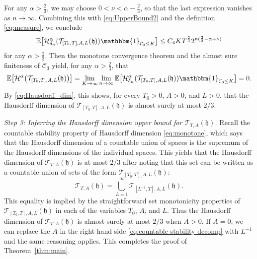 \documentclass[oneside,final,11pt]{amsart}
\theoremstyle{definition}
\newcommand{\fh}{\mathfrak{h}}
\newcommand{\CT}{\mathcal{T}}
\newcommand{\CC}{\mathcal{C}}
\newcommand{\CH}{\mathcal{H}}
\newcommand{\1}[1]{\mathbf{1}_{#1}}
\newcommand{\km}[1]{\marginnote{\tiny{\color{red}[KM: #1]}}}
\newcommand{\E}{\mathbb E}
\newcommand{\one}{\mathbbm{1}}
\numberwithin{equation}{section}
\begin{document}
%
For any $\alpha > \frac{2}{3}$, we may choose $0 < \nu < \alpha-\frac{2}{3}$, so that the last expression vanishes as $n \to \infty$. Combining this with \eqref{eq:UpperBound2} and the definition \eqref{eq:measure}, we conclude
%
$$\E\bigl[\CH^\alpha_{\delta_n}(\CT_{[T_0, T], A, L}(\fh))\one_{\CC_3\leq K}\bigr] \leq  C_4 KT^{\frac{2}{3}} 2^{n (\frac{2}{3}-\alpha + \nu)}$$
%
for any $\alpha > \frac{2}{3}$. Then the monotone convergence theorem and the almost sure finiteness of $\CC_3$ yield, for any $\alpha > \frac{2}{3}$, that
%
\begin{equation}\label{eq:upper-bound-expectation}
\E\bigl[\CH^\alpha \bigl(\CT_{[T_0, T], A, L}(\fh)\bigr)\bigr] = \lim_{K\to\infty}\lim_{n \to \infty} \E\bigl[\CH^\alpha_{\delta_n}(\CT_{[T_0, T], A, L}(\fh))\one_{\CC_3\leq K}\bigr] = 0.
\end{equation}
%
By \eqref{eq:Hausdorff_dim}, this shows, for every $T_0>0$, $A>0$, and $L>0$, that the Hausdorff dimension of $\CT_{[T_0, T], A, L}(\fh)$ is almost surely at most $2/3$.
\medskip

\emph{Step 3: Inferring the Hausdorff dimension upper bound for $\CT_{T,A}(\fh)$.} Recall the countable stability property of Hausdorff dimension \eqref{eq:monotone}, which says that the Hausdorff dimension of a countable union of spaces is the supremum of the Hausdorff dimensions of the individual spaces. This yields that the Hausdorff dimension of $\CT_{T, A}(\fh)$ is at most $2/3$ after noting that this set can be written as a countable union of sets of the form $\CT_{[T_0, T], A, L}(\fh)$:
%
\begin{equation}\label{eq:countable stability decomp}
\CT_{T,A}(\fh) = \bigcup_{L=1}^{\infty} \CT_{[L^{-1}, T], A, L}(\fh).
\end{equation}
%
This equality is implied by the straightforward set monotonicity properties of $\CT_{[T_0, T], A, L}(\fh)$ in each of the variables $T_0$, $A$, and $L$. Thus the Hausdorff dimension of $\CT_{T,A}(\fh)$ is almost surely at most $2/3$ when $A>0$. If $A=0$, we can replace the $A$ in the right-hand side \eqref{eq:countable stability decomp} with $L^{-1}$ and the same reasoning applies. This completes the proof of Theorem~\ref{thm:main}.
%

\end{document}
